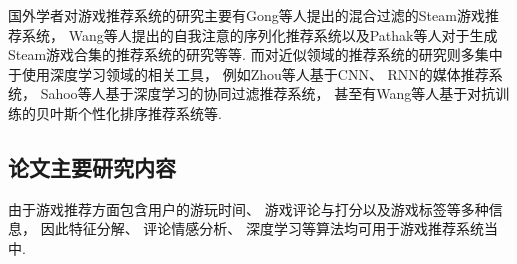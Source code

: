 国外学者对游戏推荐系统的研究主要有Gong等人\cite{gongHybridRecommenderSystem2020}提出的混合过滤的Steam游戏推荐系统，
Wang\cite{kangSelfAttentiveSequentialRecommendation2018}等人提出的自我注意的序列化推荐系统以及Pathak\cite{pathakGeneratingPersonalizingBundle2017}等人对于生成Steam游戏合集的推荐系统的研究等等.
而对近似领域的推荐系统的研究则多集中于使用深度学习领域的相关工具，
例如Zhou\cite{zhouCNNRNNBasedIntelligent2021}等人基于CNN、
RNN的媒体推荐系统，
Sahoo\cite{sahooDeepRecoDeepLearning2019}等人基于深度学习的协同过滤推荐系统，
甚至有Wang\cite{wangAdversarialTrainingBasedMean2020}等人基于对抗训练的贝叶斯个性化排序推荐系统等.

\subsection{论文主要研究内容}

由于游戏推荐方面包含用户的游玩时间、
游戏评论与打分以及游戏标签等多种信息，
因此特征分解、
评论情感分析、
深度学习等算法均可用于游戏推荐系统当中.

